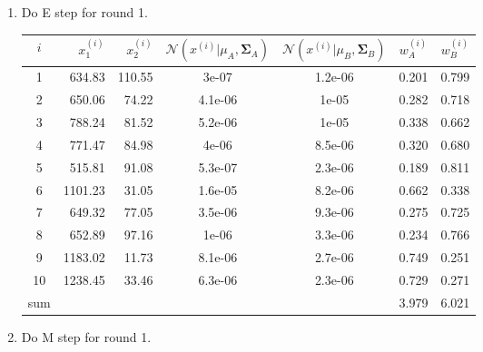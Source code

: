 \begin{enumerate}
\vspace{10mm}

\item Do E step for round 1.

\begin{center}
\small
\begin{tabular}{crrcccc}
\toprule
$i$ & $x_1^{(i)}$ & $x_2^{(i)}$ & $\mathcal{N}(x^{(i)}| \mu_A, \boldsymbol\Sigma_A)$ & $\mathcal{N}(x^{(i)}|\mu_B, \boldsymbol\Sigma_B)$ & $w_A^{(i)}$ & $w_B^{(i)}$ \\
\midrule
1 & 634.83 & 110.55 & 3e-07 & 1.2e-06 & 0.201 & 0.799 \\ 
  2 & 650.06 & 74.22 & 4.1e-06 & 1e-05 & 0.282 & 0.718 \\ 
  3 & 788.24 & 81.52 & 5.2e-06 & 1e-05 & 0.338 & 0.662 \\ 
  4 & 771.47 & 84.98 & 4e-06 & 8.5e-06 & 0.320 & 0.680 \\ 
  5 & 515.81 & 91.08 & 5.3e-07 & 2.3e-06 & 0.189 & 0.811 \\ 
  6 & 1101.23 & 31.05 & 1.6e-05 & 8.2e-06 & 0.662 & 0.338 \\ 
  7 & 649.32 & 77.05 & 3.5e-06 & 9.3e-06 & 0.275 & 0.725 \\ 
  8 & 652.89 & 97.16 & 1e-06 & 3.3e-06 & 0.234 & 0.766 \\ 
  9 & 1183.02 & 11.73 & 8.1e-06 & 2.7e-06 & 0.749 & 0.251 \\ 
  10 & 1238.45 & 33.46 & 6.3e-06 & 2.3e-06 & 0.729 & 0.271 \\ 
\midrule
sum & & & & & 3.979 & 6.021 \\
\bottomrule
\end{tabular}
\end{center}

\vspace{5mm}

\item Do M step for round 1.


\end{enumerate}
